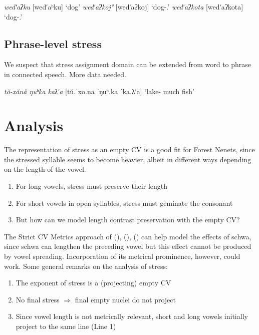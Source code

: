\documentclass[a4paper, 12pt]{article}
\newcommand{\citeay}[2][]{
   \citeauthor{#2} (\citeyear[#1]{#2})}
\begin{document}
	\pex\label{}\a \emph{wedʹaʔku} [wedʹaʰku] \hfill `dog'
		\a \emph{wedʹaʔkoj°} [wedʹaʔkoj] \hfill `dog-{\Poss}.{\Fsg}'
		\a \emph{wedʹaʔkota} [wedʹaʔkota] \hfill `dog-{\Poss}.{\Tsg}'
	\xe
	
		\subsection{Phrase-level stress}
			
	We suspect that stress assignment domain can be extended from word to phrase in connected speech. More data needed.
	
	\ex\label{}\emph{tŏ-xănă ŋuʰka kaλʹa} [tŭ.ˈxo.na ˈŋuʰ.ka ˈka.λʹa] \hfill `lake-{\Loc} much fish' \xe
	
	\section{Analysis}
	
	The representation of stress as an empty CV \parencite{scheersszigetvari2005} is a good fit for Forest Nenets, since the stressed syllable seems to become heavier, albeit in different ways depending on the length of the vowel.
	
	\begin{enumerate}[$\gg$]
		\item For long vowels, stress must preserve their length
		\item For short vowels in open syllables, stress must geminate the consonant
		\item But how can we model length contrast preservation with the empty CV?
	\end{enumerate}
	The Strict CV Metrics approach of \citeay{faust-ulfs2018}, \citeay{alexei-ulfs2022}, \citeay{ulfsbjorninntoappear} can help model the effects of schwa, since schwa can lengthen the preceding vowel but this effect cannot be produced by vowel spreading. Incorporation of its metrical prominence, however, could work. Some general remarks on the analysis of stress:
	
	\begin{enumerate}[$\gg$]
		\item The exponent of stress is a (projecting) empty CV
		\item No final stress $\Rightarrow$ final empty nuclei do not project 
		\item Since vowel length is not metrically relevant, short and long vowels initially project to the same line (Line 1) 
	\end{enumerate}
	
\end{document}
